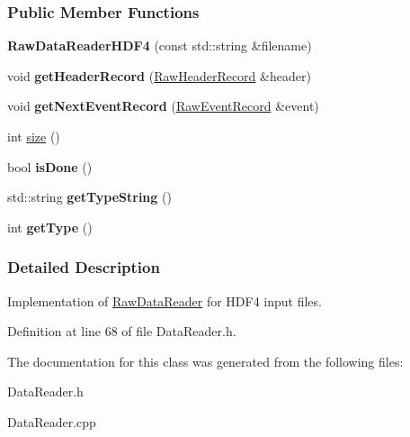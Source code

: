 \subsubsection*{Public Member Functions}
\begin{DoxyCompactItemize}
\item 
\hypertarget{classRawDataReaderHDF4_a5b37d2a4ff84f6eed2da5f1de561375a}{
{\bfseries RawDataReaderHDF4} (const std::string \&filename)}
\label{classRawDataReaderHDF4_a5b37d2a4ff84f6eed2da5f1de561375a}

\item 
\hypertarget{classRawDataReaderHDF4_a22b736687a2a4457faad3c81504e25b2}{
void {\bfseries getHeaderRecord} (\hyperlink{structRawHeaderRecord}{RawHeaderRecord} \&header)}
\label{classRawDataReaderHDF4_a22b736687a2a4457faad3c81504e25b2}

\item 
\hypertarget{classRawDataReaderHDF4_a653b654370668e69836da44befccb3f1}{
void {\bfseries getNextEventRecord} (\hyperlink{structRawEventRecord}{RawEventRecord} \&event)}
\label{classRawDataReaderHDF4_a653b654370668e69836da44befccb3f1}

\item 
\hypertarget{classRawDataReaderHDF4_a70f0b243aec5ed6d33eb6e2878a07046}{
int \hyperlink{classRawDataReaderHDF4_a70f0b243aec5ed6d33eb6e2878a07046}{size} ()}
\label{classRawDataReaderHDF4_a70f0b243aec5ed6d33eb6e2878a07046}

\item 
\hypertarget{classRawDataReaderHDF4_aca39621e50d5b60f6918935f7a9b32be}{
bool {\bfseries isDone} ()}
\label{classRawDataReaderHDF4_aca39621e50d5b60f6918935f7a9b32be}

\item 
\hypertarget{classRawDataReaderHDF4_a936c6a127b504b118d67c04b5d9bace3}{
std::string {\bfseries getTypeString} ()}
\label{classRawDataReaderHDF4_a936c6a127b504b118d67c04b5d9bace3}

\item 
\hypertarget{classRawDataReaderHDF4_ab32ddb7a12206ef68fec23714bc9b9ac}{
int {\bfseries getType} ()}
\label{classRawDataReaderHDF4_ab32ddb7a12206ef68fec23714bc9b9ac}

\end{DoxyCompactItemize}


\subsubsection{Detailed Description}
Implementation of \hyperlink{classRawDataReader}{RawDataReader} for HDF4 input files. 

Definition at line 68 of file DataReader.h.



The documentation for this class was generated from the following files:\begin{DoxyCompactItemize}
\item 
DataReader.h\item 
DataReader.cpp\end{DoxyCompactItemize}
